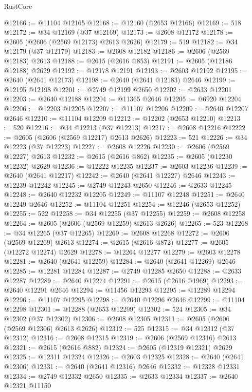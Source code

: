 \begin{lexlean}{RustCore}
\begin{coremodule}
@12166 := @11104 @12165
@12168 := @12160 (@2653 @12166)
@12169 := 518
@12172 := @34 @12169 (@37 @12169)
@12173 := @2608 @12172
@12178 := @2605 (@2606 (@2569 @12173) @2613 @2626)
@12179 := 519
@12182 := @34 @12179 (@37 @12179)
@12183 := @2608 @12182
@12186 := @2606 (@2569 @12183) @2613
@12188 := @2615 (@2616 @853)
@12191 := @2605 (@12186 @12188) @2629
@12192 := @12178 @12191
@12193 := @2603 @12192
@12195 := @2640 (@2641 @12173)
@12198 := @2640 (@2641 @12183) @2646
@12199 := @12195 @12198
@12201 := @2749 @12199 @2650
@12202 := @2633 @12201
@12203 := @2640 @12188
@12204 := @11365 @2646
@12205 := @6920 @12204
@12206 := @12203 @12205
@12207 := @11107 @12206
@12209 := @2640 @12207 @2646
@12210 := @11104 @12209
@12212 := @12202 (@2653 @12210)
@12213 := 520
@12216 := @34 @12213 (@37 @12213)
@12217 := @2608 @12216
@12222 := @2605 (@2606 (@2569 @12217) @2613 @2626)
@12223 := 521
@12226 := @34 @12223 (@37 @12223)
@12227 := @2608 @12226
@12230 := @2606 (@2569 @12227) @2613
@12232 := @2615 (@2616 @862)
@12235 := @2605 (@12230 @12232) @2629
@12236 := @12222 @12235
@12237 := @2603 @12236
@12239 := @2640 (@2641 @12217)
@12242 := @2640 (@2641 @12227) @2646
@12243 := @12239 @12242
@12245 := @2749 @12243 @2650
@12246 := @2633 @12245
@12248 := @2640 @12232 @12205
@12249 := @11107 @12248
@12251 := @2640 @12249 @2646
@12252 := @11104 @12251
@12254 := @12246 (@2653 @12252)
@12255 := 522
@12258 := @34 @12255 (@37 @12255)
@12259 := @2608 @12258
@12264 := @2605 (@2606 (@2569 @12259) @2613 @2626)
@12265 := 523
@12268 := @34 @12265 (@37 @12265)
@12269 := @2608 @12268
@12272 := @2606 (@2569 @12269) @2613
@12274 := @2615 (@2616 @872)
@12277 := @2605 (@12272 @12274) @2629
@12278 := @12264 @12277
@12279 := @2603 @12278
@12281 := @2640 (@2641 @12259)
@12284 := @2640 (@2641 @12269) @2646
@12285 := @12281 @12284
@12287 := @2749 @12285 @2650
@12288 := @2633 @12287
@12289 := @2640 @12274
@12291 := @2615 (@2616 @1969)
@12293 := @2640 @12291 @2646
@12294 := @11456 @12293
@12295 := @12289 @12294
@12296 := @11107 @12295
@12298 := @2640 @12296 @2646
@12299 := @11104 @12298
@12301 := @12288 (@2653 @12299)
@12302 := 524
@12305 := @34 @12302 (@37 @12302)
@12306 := @2608 @12305
@12311 := @2605 (@2606 (@2569 @12306) @2613 @2626)
@12312 := 525
@12315 := @34 @12312 (@37 @12312)
@12316 := @2608 @12315
@12319 := @2606 (@2569 @12316) @2613
@12321 := @2615 (@2616 @882)
@12324 := @2605 (@12319 @12321) @2629
@12325 := @12311 @12324
@12326 := @2603 @12325
@12328 := @2640 (@2641 @12306)
@12331 := @2640 (@2641 @12316) @2646
@12332 := @12328 @12331
@12334 := @2749 @12332 @2650
@12335 := @2633 @12334
@12337 := @2640 @12321 @11150

\end{coremodule}
\end{lexlean}
